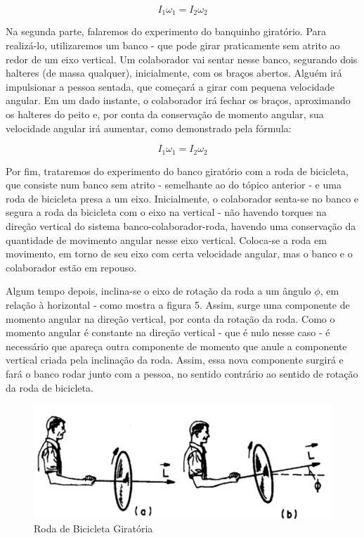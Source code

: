 \[I_1 \omega _1 = I_2 \omega _2 \]

Na segunda parte, falaremos do experimento do banquinho giratório. Para realizá-lo, utilizaremos um banco - que pode girar praticamente sem atrito ao redor de um eixo vertical. Um colaborador vai sentar nesse banco, segurando dois halteres (de massa qualquer), inicialmente, com os braços abertos. Alguém irá impulsionar a pessoa sentada, que começará a girar com pequena velocidade angular. Em um dado instante, o colaborador irá fechar os braços, aproximando os halteres do peito e, por conta da conservação de momento angular, sua velocidade angular irá aumentar, como demonstrado pela fórmula:

\[I_1 \omega _1 = I_2 \omega _2 \]

Por fim, trataremos do experimento do banco giratório com a roda de bicicleta, que consiste num banco sem atrito - semelhante ao do tópico anterior - e uma roda de bicicleta presa a um eixo. Inicialmente, o colaborador senta-se no banco e segura a roda da bicicleta com o eixo na vertical - não havendo torques na direção vertical do sistema banco-colaborador-roda, havendo uma conservação da quantidade de movimento angular nesse eixo vertical. Coloca-se a roda em movimento, em torno de seu eixo com certa velocidade angular, mas o banco e o colaborador estão em repouso.

Algum tempo depois, inclina-se o eixo de rotação da roda a um ângulo $\phi$, em relação à horizontal - como mostra a figura 5. Assim, surge uma componente de momento angular na direção vertical, por conta da rotação da roda. Como o momento angular é constante na direção vertical - que é nulo nesse caso - é necessário que apareça outra componente de momento que anule a componente vertical criada pela inclinação da roda. Assim, essa nova componente surgirá e fará o banco rodar junto com a pessoa, no sentido contrário ao sentido de rotação da roda de bicicleta.

\begin{figure}[H]
  \centering
  \includegraphics[scale=1]{images/i5.png}
  \caption{Roda de Bicicleta Giratória}
\end{figure}

